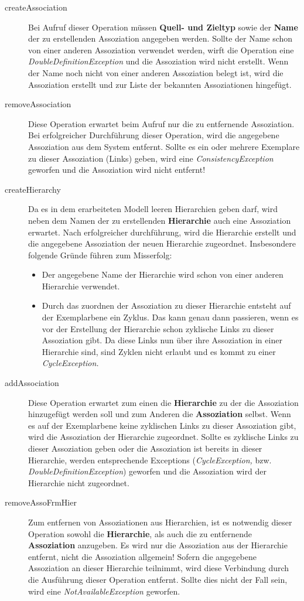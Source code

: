 \begin{description}
\item[createAssociation] Bei Aufruf dieser Operation müssen \textbf{Quell- und Zieltyp} sowie der \textbf{Name} der zu erstellenden Assoziation 
angegeben werden.
Sollte der Name schon von einer anderen Assoziation verwendet werden, wirft die Operation eine \emph{DoubleDefinitionException} und die Assoziation wird nicht
erstellt.
Wenn der Name noch nicht von einer anderen Assoziation belegt ist, wird die Assoziation erstellt und zur Liste der bekannten Assoziationen hingefügt. 
\item[removeAssociation] Diese Operation erwartet beim Aufruf nur die zu entfernende {Assoziation}. Bei erfolgreicher Durchführung dieser Operation, wird die
angegebene Assoziation aus dem System entfernt. 
Sollte es ein oder mehrere Exemplare zu dieser Assoziation (Links) geben, wird eine \emph{ConsistencyException} geworfen und die Assoziation wird nicht entfernt! 
\item[createHierarchy] Da es in dem erarbeiteten Modell leeren Hierarchien geben darf, wird neben dem Namen der zu erstellenden \textbf{Hierarchie} auch eine 
{Assoziation} erwartet. Nach erfolgreicher durchführung, wird die Hierarchie erstellt und die angegebene Assoziation der neuen Hierarchie zugeordnet.
Insbesondere folgende Gründe führen zum Misserfolg:
\begin{itemize}
\item Der angegebene Name der Hierarchie wird schon von einer anderen Hierarchie verwendet.
\item Durch das zuordnen der Assoziation zu dieser Hierarchie entsteht auf der Exemplarbene ein Zyklus. Das kann genau dann passieren, wenn es vor 
der Erstellung der Hierarchie schon zyklische Links zu dieser Assoziation gibt. Da diese Links nun über ihre Assoziation in einer Hierarchie sind, sind 
Zyklen nicht erlaubt und es kommt zu einer \emph{CycleException.}
\end{itemize}
\item[addAssociation] Diese Operation erwartet zum einen die \textbf{Hierarchie} zu der die Assoziation hinzugefügt werden soll und zum Anderen die \textbf{Assoziation} selbst.
Wenn es auf der Exemplarbene keine zyklischen Links zu dieser Assoziation gibt, wird die Assoziation der Hierarchie zugeordnet. Sollte es zyklische Links
zu dieser Assoziation geben oder die Assoziation ist bereits in dieser Hierarchie, werden entsprechende Exceptions (\emph{CycleException,} bzw. \emph{DoubleDefinitionException}) 
geworfen und die Assoziation wird der Hierarchie nicht zugeordnet.
\item[removeAssoFrmHier] Zum entfernen von Assoziationen aus Hierarchien, ist es notwendig dieser Operation sowohl die \textbf{Hierarchie}, als auch die zu entfernende 
\textbf{Assoziation} anzugeben. Es wird nur die Assoziation aus der Hierarchie entfernt, nicht die Assoziation allgemein! Sofern die angegebene Assoziation an dieser 
Hierarchie teilnimmt, wird diese Verbindung durch die Ausführung dieser Operation entfernt. Sollte dies nicht der Fall sein, wird eine
\emph{NotAvailableException} geworfen. 
\end{description}



